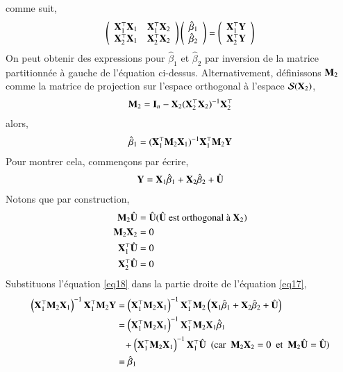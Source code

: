 \documentclass[10pt, reqno]{amsart}
\begin{document}
comme suit,
\begin{align*}
\left(
\begin{array}{cc}
\mathbf X_1^\top\mathbf X_1&\mathbf X_1^\top\mathbf X_2\\
\mathbf X_2^\top\mathbf X_1&\mathbf X_2^\top\mathbf X_2
\end{array}
\right)
\left(
\begin{array}{c}
\hat{\beta}_1\\
\hat{\beta}_2
\end{array}
\right)
=
\left(
\begin{array}{c}
\mathbf X_1^\top\mathbf Y\\
\mathbf X_2^\top\mathbf Y
\end{array}
\right)
\end{align*}
On peut  obtenir des expressions pour $\hat{\beta}_1$ et $\hat{\beta}_2$ par inversion de la matrice partitionnée à gauche de l'équation ci-dessus. Alternativement, définissons $\mathbf M_2$ comme la matrice de projection sur l'espace orthogonal à l'espace $\mathcal{S}(\mathbf X_2)$,
\begin{align*}
\mathbf M_2 = \mathbf{I}_n - \mathbf X_2(\mathbf X_2^\top\mathbf X_2)^{-1}\mathbf X_2^\top
\end{align*}
alors,
\begin{align}
\hat{\beta}_1 = (\mathbf X_1^\top\mathbf M_2 \mathbf X_1)^{-1}\mathbf X_1^\top\mathbf M_2\mathbf Y
\label{eq17}
\end{align}
Pour montrer cela, commençons par écrire,
\begin{align}
\mathbf Y = \mathbf X_1\hat{\beta}_1+\mathbf X_2\hat{\beta}_2 + \hat{\mathbf U}
\label{eq18}
\end{align} 
Notons que par construction,
\begin{align*}
\mathbf M_2\hat{\mathbf U} &= \hat{\mathbf U}(\hat{\mathbf U} \ \textrm{est orthogonal à} \ \mathbf X_2)\\
\mathbf M_2\mathbf X_2 &= 0\\
\mathbf X_1^\top\hat{\mathbf U} &=0\\
\mathbf X_2^\top\hat{\mathbf U} &=0
\end{align*}
Substituons l'équation \eqref{eq18} dans la partie droite de l'équation \eqref{eq17},
\begin{align*}
\left(\mathbf X_1^\top\mathbf M_2\mathbf X_1\right)^{-1}
\mathbf X_1^\top\mathbf M_2\mathbf Y&=\left(\mathbf X_1^\top\mathbf M_2\mathbf X_1\right)^{-1}
\mathbf X_1^\top\mathbf M_2\left(\mathbf X_1\hat{\beta}_1+\mathbf X_2\hat{\beta}_2 + \hat{\mathbf U}\right)\\
&=\left(\mathbf X_1^\top\mathbf M_2\mathbf X_1\right)^{-1}
\mathbf X_1^\top\mathbf M_2\mathbf X_1\hat{\beta}_1\\
 &\ \ \ +
\left(\mathbf X_1^\top\mathbf M_2\mathbf X_1\right)^{-1}
\mathbf X_1^\top\hat{\mathbf U} \ \ (\textrm{car \ }\mathbf M_2\mathbf X_2 = 0 \textrm{ \ et \ } 
 \mathbf M_2\hat{\mathbf U} = \hat{\mathbf U})\\
&=\hat{\beta}_1
\end{align*}
\end{document}
